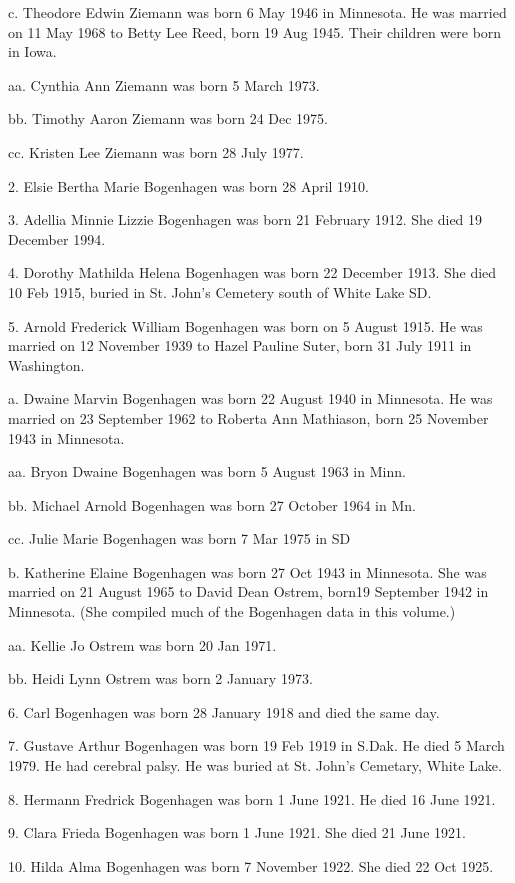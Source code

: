 \documentclass[a4paper]{article}
\begin{document}
c. Theodore Edwin Ziemann was born 6 May 1946 in Minnesota.  He was married on 11 May 1968 to Betty Lee Reed, born 19 Aug 1945. Their children were born in Iowa.

aa. Cynthia Ann Ziemann was born 5 March 1973.

bb. Timothy Aaron Ziemann was born 24 Dec 1975.

cc. Kristen Lee Ziemann was born 28 July 1977.

2. Elsie Bertha Marie Bogenhagen was born 28 April 1910.

3. Adellia Minnie Lizzie Bogenhagen was born 21 February 1912.  She died 19 December 1994.

4. Dorothy Mathilda Helena Bogenhagen was born 22 December 1913.  She died 10 Feb 1915, buried in St. John's Cemetery south of White Lake SD.

5. Arnold Frederick William Bogenhagen was born on 5 August 1915.  He was married on 12 November 1939 to Hazel Pauline Suter, born 31 July 1911 in Washington. 
		
a. Dwaine Marvin Bogenhagen was born 22 August 1940 in Minnesota. He was married on 23 September 1962 to Roberta Ann Mathiason, born 25 November 1943 in Minnesota. 

aa. Bryon Dwaine Bogenhagen was born 5 August 1963 in Minn.

bb. Michael Arnold Bogenhagen was born 27 October 1964 in Mn.

cc. Julie Marie Bogenhagen was born 7 Mar 1975 in SD

b. Katherine Elaine Bogenhagen was born 27 Oct 1943 in Minnesota. She was married on 21 August 1965 to David Dean Ostrem, born19 September 1942 in Minnesota.  (She compiled much of the Bogenhagen data in this volume.)

aa. Kellie Jo Ostrem was born 20 Jan 1971.

bb. Heidi Lynn Ostrem was born 2 January 1973.

6. Carl Bogenhagen was born 28 January 1918 and died the same day.

7. Gustave Arthur Bogenhagen was born 19 Feb 1919 in S.Dak.  He died 5 March 1979.  He had cerebral palsy.  He was buried at St. John's Cemetary, White Lake.

8. Hermann Fredrick Bogenhagen was born 1 June 1921.  He died 16 June 1921.

9. Clara Frieda Bogenhagen was born 1 June 1921. She died 21 June 1921.

10. Hilda Alma Bogenhagen was born 7 November 1922.  She died 22 Oct 1925.
\end{document}

